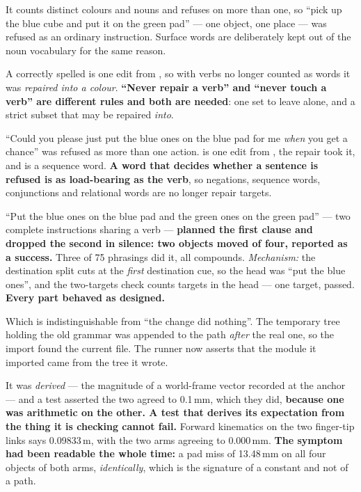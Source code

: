 {It counts distinct colours and nouns and refuses on more than one, so ``pick up
the blue cube and put it on the green pad'' --- one object, one place --- was
refused as an ordinary instruction. Surface words are deliberately kept out of
the noun vocabulary for the same reason.}

{A correctly spelled  is one edit from , so with verbs no
longer counted as words it was \emph{repaired into a colour}. \textbf{``Never
repair a verb'' and ``never touch a verb'' are different rules and both are
needed}: one set to leave alone, and a strict subset that may be repaired
\emph{into}.}

{``Could you please just put the blue ones on the blue pad for me \emph{when} you
get a chance'' was refused as more than one action.  is one edit from
, the repair took it, and  is a sequence word.
\textbf{A word that decides whether a sentence is refused is as load-bearing as
the verb}, so negations, sequence words, conjunctions and relational words are no
longer repair targets.}

{``Put the blue ones on the blue pad and the green ones on the green pad'' ---
two complete instructions sharing a verb --- \textbf{planned the first clause and
dropped the second in silence: two objects moved of four, reported as a
success.} Three of 75 phrasings did it, all compounds. \textit{Mechanism:} the
destination split cuts at the \emph{first} destination cue, so the head was ``put
the blue ones'', and the two-targets check counts targets in the head --- one
target, passed. \textbf{Every part behaved as designed.}}

{Which is indistinguishable from ``the change did nothing''. The temporary tree
holding the old grammar was appended to the path \emph{after} the real one, so
the import found the current file. The runner now asserts that the module it
imported came from the tree it wrote.}

{It was \emph{derived} --- the magnitude of a world-frame vector recorded at the
anchor --- and a test asserted the two agreed to 0.1\,mm, which they did,
\textbf{because one was arithmetic on the other. A test that derives its
expectation from the thing it is checking cannot fail.} Forward kinematics on the
two finger-tip links says 0.09833\,m, with the two arms agreeing to 0.000\,mm.
\textbf{The symptom had been readable the whole time:} a pad miss of 13.48\,mm on
all four objects of both arms, \emph{identically}, which is the signature of a
constant and not of a path.}

